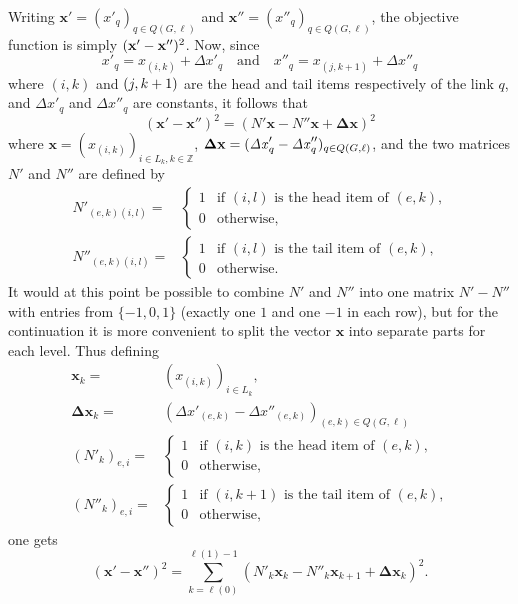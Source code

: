 \documentclass{article}
\newcommand{\Z}{\mathbb{Z}}
\newcommand{\vek}{\mathbf}
\theoremstyle{definition}
\begin{document}
Writing \(\vek{x}' = (x'_q)_{q \in Q(G,\ell)}\) and \(\vek{x}'' = 
(x''_q)_{q \in Q(G,\ell)}\), the objective function is simply 
$(\vek{x}' -\nobreak \vek{x}'')^2$. Now, since
\begin{equation}
  x'_q = x_{(i,k)} + \mathit{\Delta x}'_q
  \quad\text{and}\quad
  x''_q = x_{(j,k+1)} + \mathit{\Delta x}''_q
\end{equation}
where $(i,k)$ and $(j,k +\nobreak 1)$ are the head and tail items 
respectively of the link $q$, and $\mathit{\Delta x}'_q$ and 
$\mathit{\Delta x}''_q$ are constants, it follows that
\begin{equation}
  (\vek{x}' - \vek{x}'')^2 =
  (N' \vek{x} - N''\vek{x} + \vek{\Delta x})^2
\end{equation}
where \(\vek{x} = (x_{(i,k)})_{i \in L_k, k \in \Z}\), 
\(\vek{\Delta x} = (\mathit{\Delta x}'_q -\nobreak 
\mathit{\Delta x}''_q)_{q \in Q(G,\ell)}\), and the two matrices $N'$ 
and $N''$ are defined by
\begin{align*}
  N'_{(e,k)(i,l)} ={}& \begin{cases}
    1& \text{if $(i,l)$ is the head item of $(e,k)$,}\\
    0& \text{otherwise,}
  \end{cases}\\
  N''_{(e,k)(i,l)} ={}& \begin{cases}
    1& \text{if $(i,l)$ is the tail item of $(e,k)$,}\\
    0& \text{otherwise.}
  \end{cases}
\end{align*}
It would at this point be possible to combine $N'$ and $N''$ into one 
matrix $N'-N''$ with entries from $\{-1,0,1\}$ (exactly one $1$ and 
one $-1$ in each row), but for the continuation it is more convenient 
to split the vector $\vek{x}$ into separate parts for each level. 
Thus defining
\begin{align*}
  \vek{x}_k ={}& (x_{(i,k)})_{i \in L_k} \text{,}\\
  \vek{\Delta x}_k ={}& (\mathit{\Delta x}'_{(e,k)} - 
    \mathit{\Delta x}''_{(e,k)} )_{(e,k) \in Q(G,\ell)} \\
  (N'_k)_{e,i} ={}& \begin{cases}
    1& \text{if $(i,k)$ is the head item of $(e,k)$,}\\
    0& \text{otherwise,}
  \end{cases}\\
  (N''_k)_{e,i} ={}& \begin{cases}
    1& \text{if $(i,k+1)$ is the tail item of $(e,k)$,}\\
    0& \text{otherwise,}
  \end{cases}
\end{align*}
one gets
\begin{equation}
  (\vek{x}' - \vek{x}'')^2 = \sum_{k=\ell(0)}^{\ell(1)-1} 
  (N'_k \vek{x}_k - N''_k \vek{x}_{k+1} + \vek{\Delta x}_k)^2
  \text{.}
\end{equation}
\end{document}
